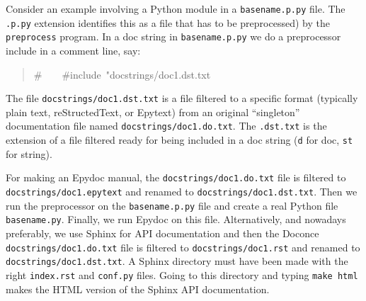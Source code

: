 \documentclass[a4paper,english]{article}
\begin{document}
Consider an example involving a Python module in a \texttt{basename.p.py} file.
The \texttt{.p.py} extension identifies this as a file that has to be
preprocessed) by the \texttt{preprocess} program.
In a doc string in \texttt{basename.p.py} we do a preprocessor include
in a comment line, say:
%
\begin{quote}{\ttfamily \raggedright \noindent
\#~~~~\#include~"docstrings/doc1.dst.txt
}
\end{quote}






The file \texttt{docstrings/doc1.dst.txt} is a file filtered to a specific format
(typically plain text, reStructedText, or Epytext) from an original
``singleton'' documentation file named \texttt{docstrings/doc1.do.txt}. The \texttt{.dst.txt}
is the extension of a file filtered ready for being included in a doc
string (\texttt{d} for doc, \texttt{st} for string).

For making an Epydoc manual, the \texttt{docstrings/doc1.do.txt} file is
filtered to \texttt{docstrings/doc1.epytext} and renamed to
\texttt{docstrings/doc1.dst.txt}.  Then we run the preprocessor on the
\texttt{basename.p.py} file and create a real Python file
\texttt{basename.py}. Finally, we run Epydoc on this file. Alternatively, and
nowadays preferably, we use Sphinx for API documentation and then the
Doconce \texttt{docstrings/doc1.do.txt} file is filtered to
\texttt{docstrings/doc1.rst} and renamed to \texttt{docstrings/doc1.dst.txt}. A
Sphinx directory must have been made with the right \texttt{index.rst} and
\texttt{conf.py} files. Going to this directory and typing \texttt{make html} makes
the HTML version of the Sphinx API documentation.
\end{document}
